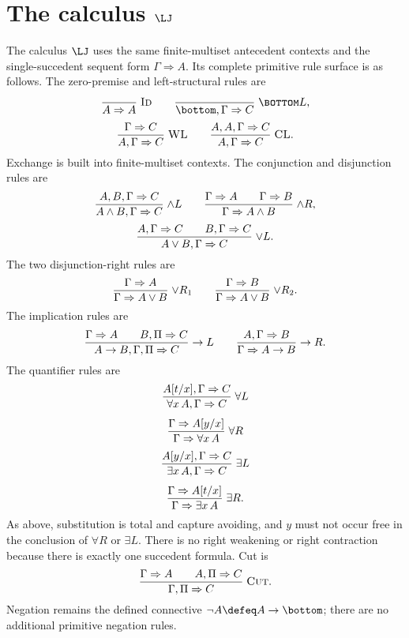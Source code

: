 \section[The calculus LJ]{The calculus \(\LJ\)}
\label{sec:lk-lj-04}

The calculus \(\LJ\) uses the same finite-multiset antecedent contexts and the
single-succedent sequent form \(\Gamma\Rightarrow A\).  Its complete primitive
rule surface is as follows.  The zero-premise and left-structural rules are
\[
\frac{}{A\Rightarrow A}\;\textsc{Id}
\qquad
\frac{}{\bottom,\Gamma\Rightarrow C}\;\textsc{\(\bottom L\)},
\]
\[
\frac{\Gamma\Rightarrow C}
     {A,\Gamma\Rightarrow C}\;\textsc{WL}
\qquad
\frac{A,A,\Gamma\Rightarrow C}
     {A,\Gamma\Rightarrow C}\;\textsc{CL}.
\]
Exchange is built into finite-multiset contexts.  The conjunction and
disjunction rules are
\[
\frac{A,B,\Gamma\Rightarrow C}
     {A\land B,\Gamma\Rightarrow C}\;\textsc{\(\land L\)}
\qquad
\frac{\Gamma\Rightarrow A\qquad\Gamma\Rightarrow B}
     {\Gamma\Rightarrow A\land B}\;\textsc{\(\land R\)},
\]
\[
\frac{A,\Gamma\Rightarrow C\qquad B,\Gamma\Rightarrow C}
     {A\lor B,\Gamma\Rightarrow C}\;\textsc{\(\lor L\)}.
\]
The two disjunction-right rules are
\[
\frac{\Gamma\Rightarrow A}
     {\Gamma\Rightarrow A\lor B}\;\textsc{\(\lor R_1\)}
\qquad
\frac{\Gamma\Rightarrow B}
     {\Gamma\Rightarrow A\lor B}\;\textsc{\(\lor R_2\)}.
\]
The implication rules are
\[
\frac{\Gamma\Rightarrow A
      \qquad
      B,\Pi\Rightarrow C}
     {A\to B,\Gamma,\Pi\Rightarrow C}\;\textsc{\(\to L\)}
\qquad
\frac{A,\Gamma\Rightarrow B}
     {\Gamma\Rightarrow A\to B}\;\textsc{\(\to R\)}.
\]
The quantifier rules are
\[
\begin{gathered}
\frac{A[t/x],\Gamma\Rightarrow C}
     {\forall x\,A,\Gamma\Rightarrow C}\;\textsc{\(\forall L\)}
\\[1ex]
\frac{\Gamma\Rightarrow A[y/x]}
     {\Gamma\Rightarrow\forall x\,A}\;\textsc{\(\forall R\)}
\\[1ex]
\frac{A[y/x],\Gamma\Rightarrow C}
     {\exists x\,A,\Gamma\Rightarrow C}\;\textsc{\(\exists L\)}
\\[1ex]
\frac{\Gamma\Rightarrow A[t/x]}
     {\Gamma\Rightarrow\exists x\,A}\;\textsc{\(\exists R\)}.
\end{gathered}
\]
As above, substitution is total and capture avoiding, and \(y\) must not occur
free in the conclusion of \(\forall R\) or \(\exists L\).  There is no right
weakening or right contraction because there is exactly one succedent formula.
Cut is
\[
\frac{\Gamma\Rightarrow A
      \qquad
      A,\Pi\Rightarrow C}
     {\Gamma,\Pi\Rightarrow C}\;\textsc{Cut}.
\]
Negation remains the defined connective
\(\neg A\defeq A\to\bottom\); there are no additional primitive negation
rules.


